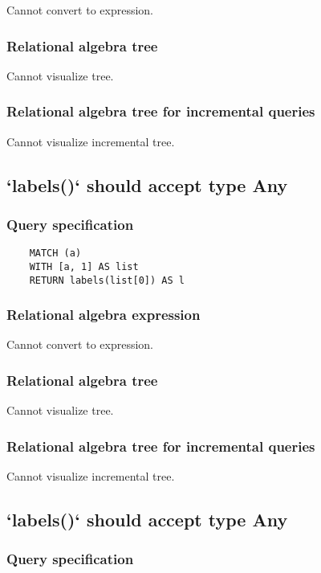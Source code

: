 	Cannot convert to expression.

	\subsubsection*{Relational algebra tree}

	Cannot visualize tree.

	\subsubsection*{Relational algebra tree for incremental queries}

	Cannot visualize incremental tree.
	\subsection{`labels()` should accept type Any}

	\subsubsection*{Query specification}

	\begin{lstlisting}
	MATCH (a)
	WITH [a, 1] AS list
	RETURN labels(list[0]) AS l
	\end{lstlisting}


	\subsubsection*{Relational algebra expression}

	Cannot convert to expression.

	\subsubsection*{Relational algebra tree}

	Cannot visualize tree.

	\subsubsection*{Relational algebra tree for incremental queries}

	Cannot visualize incremental tree.
	\subsection{`labels()` should accept type Any}

	\subsubsection*{Query specification}

